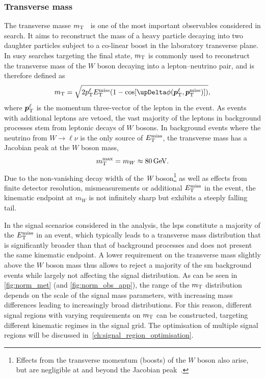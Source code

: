 \subsubsection{Transverse mass}

The transverse masse $m_{\textrm{T}}$~\cite{Arnison:1983rp,transversemass:163856} is one of the most important observables considered in \onelepton search. It aims to reconstruct the mass of a heavy particle decaying into two daughter particles subject to a co-linear boost in the laboratory transverse plane. In \gls{susy} searches targeting the \onelepton final state, $m_{\textrm{T}}$ is commonly used to reconstruct the transverse mass of the $W$ boson decaying into a lepton--neutrino pair, and is therefore defined as
\begin{equation}
	\mt = \sqrt{2\pt^\ell\etmiss(1-\cos[\upDelta\phi(\makemebold{p}_\mathrm{T}^\ell,\makemebold{p}_\mathrm{T}^\mathrm{miss})])},
\end{equation}
where $\makemebold{p}_\mathrm{T}^\ell$ is the momentum three-vector of the lepton in the event. As events with additional leptons are vetoed, the vast majority of the leptons in background processes stem from leptonic decays of $W$ bosons. In background events where the neutrino from $W\rightarrow\ell\nu$ is the only source of $E_{\textrm{T}}^{\textrm{miss}}$, the transverse mass has a Jacobian peak at the $W$ boson mass, 
\begin{equation}
	\mt^\mathrm{max} = m_W \approx \SI{80}{\GeV}.
\end{equation}
Due to the non-vanishing decay width of the \textit{W} boson\footnote{Effects from the transverse momentum (\ie boosts) of the $W$ boson also arise, but are negligible at and beyond the Jacobian peak~\cite{Baur:2003jy,Smith:1983aa}.} as well as effects from finite detector resolution, mismeasurements or additional $E_{\textrm{T}}^{\textrm{miss}}$ in the event, the kinematic endpoint at $m_W$ is not infinitely sharp but exhibits a steeply falling tail.

In the signal scenarios considered in the analysis, the \glspl{lsp} constitute a majority of the $E_{\textrm{T}}^{\textrm{miss}}$ in an event, which typically leads to a transverse mass distribution that is significantly broader than that of background processes and does not present the same kinematic endpoint. A lower requirement on the transverse mass slightly above the $W$ boson mass thus allows to reject a majority of the \gls{sm} background events while largely not affecting the signal distribution. As can be seen in \cref{fig:norm_met} (and \cref{fig:norm_obs_app}), the range of the $m_{\textrm{T}}$ distribution depends on the scale of the signal mass parameters, with increasing mass differences leading to increasingly broad distributions. For this reason, different signal regions with varying requirements on $m_{\textrm{T}}$ can be constructed, targeting different kinematic regimes in the signal grid. The optimisation of multiple signal regions will be discussed in~\cref{ch:signal_region_optimisation}.

